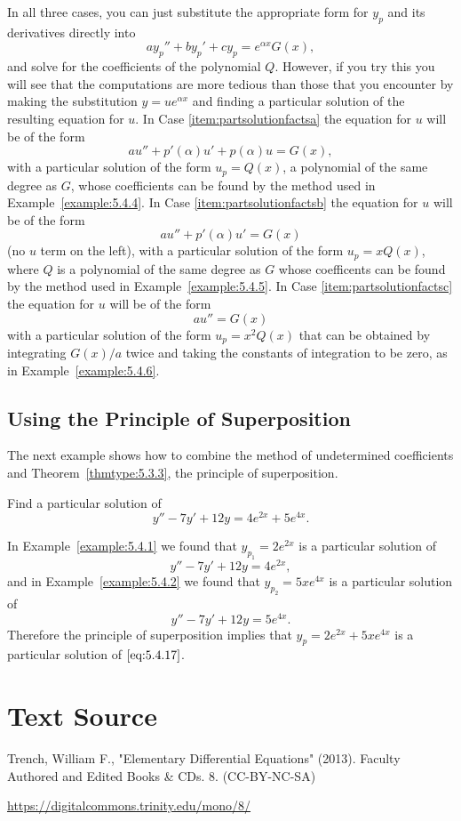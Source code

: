 \documentclass{ximera}
\begin{document}
In all three cases, you can just substitute the appropriate form for
$y_p$ and its derivatives directly into
$$
ay_p''+by_p'+cy_p=e^{\alpha x}G(x),
$$
and solve for the coefficients of the polynomial $Q$. However, if you
try this you will see that the computations are more tedious than
those that you encounter by making the substitution $y=ue^{\alpha x}$
and finding a particular solution of the resulting equation for $u$.
In Case \ref{item:partsolutionfactsa}
the equation for $u$ will be of the form
$$
au''+p'(\alpha)u'+p(\alpha)u=G(x),
$$
with a particular solution of the form $u_p=Q(x)$, a polynomial of the
same degree as $G$, whose coefficients can be found by the method used
in Example~\ref{example:5.4.4}. In Case \ref{item:partsolutionfactsb}  the equation for
$u$ will be of the form
$$
au''+p'(\alpha)u'=G(x)
$$
(no $u$ term on the left), with a particular solution of the form
$u_p=xQ(x)$, where $Q$ is a polynomial of the same degree as $G$ whose
coefficents can be found by the method used in
Example~\ref{example:5.4.5}. In Case \ref{item:partsolutionfactsc}  the equation for $u$
will be of the form
$$
au''=G(x)
$$
with a particular solution of the form $u_p=x^2Q(x)$ that can be
obtained by integrating $G(x)/a$ twice and taking the constants of
integration to be zero, as in Example~\ref{example:5.4.6}.
 
\subsection*{Using the Principle of Superposition}
 
The next example shows how to combine the method of undetermined
coefficients and Theorem~\ref{thmtype:5.3.3}, the principle of
superposition.
 
\begin{example}\label{example:5.4.7}
Find a particular solution of
\begin{equation} \label{eq:5.4.17}
y''-7y'+12y=4e^{2x}+5e^{4x}.
\end{equation}
 
 
\begin{explanation}
In Example~\ref{example:5.4.1} we found that $y_{p_1}=2e^{2x}$
is a particular solution of
$$
y''-7y'+12y=4e^{2x},
$$
and in Example~\ref{example:5.4.2} we found that $y_{p_2}=5xe^{4x}$
is a particular solution of
$$
y''-7y'+12y=5e^{4x}.
$$
Therefore the principle of superposition implies that
$y_p=2e^{2x}+5xe^{4x}$ is a particular solution of $\eqref{eq:5.4.17}$.
\end{explanation}
\end{example}
\section*{Text Source}
Trench, William F., "Elementary Differential Equations" (2013). Faculty Authored and Edited Books \& CDs. 8. (CC-BY-NC-SA)
 
\href{https://digitalcommons.trinity.edu/mono/8/}{https://digitalcommons.trinity.edu/mono/8/}
 
\end{document}

